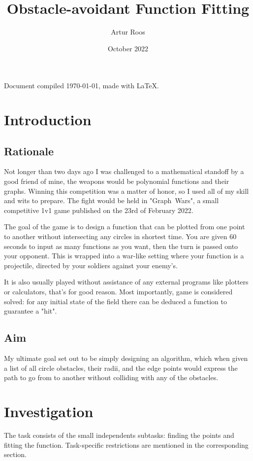 \documentclass[12pt, titlepage]{article}
\title{Obstacle-avoidant Function Fitting}
\author{Artur Roos}
\date{October 2022}
\begin{document}
\maketitle
\tableofcontents

{
\centering
Document compiled \today, made with \LaTeX.
}

\section{Introduction}
\subsection{Rationale}
Not longer than two days ago I was challenged to a mathematical standoff by a 
good friend of mine, the weapons would be polynomial functions and their 
graphs. Winning this competition was a matter of honor, so I used all of my 
skill and wits to prepare. The fight would be held in \mbox{"Graph Wars"}, a 
small competitive 1v1 game published on the 23rd of February 2022. 

The goal of the game is to design a function that can be plotted from one point
to another without intersecting any circles in shortest time. You are given 
60 seconds to input as many functions as you want, then the turn is passed onto
your opponent.
This is wrapped into a war-like setting where your function is a projectile, 
directed by your soldiers against your enemy's.

It is also usually played without assistance of any external programs like 
plotters or calculators, that's for good reason. Most importantly, game is
considered solved: for any initial state of the field there can be deduced a 
function to guarantee a "hit". 

\subsection{Aim}
My ultimate goal  set out to be simply designing an algorithm, which when given
a list of all circle obstacles, their radii, and the edge points would express
the path to go from to another without colliding with any of the obstacles. 

\section{Investigation}
The task consists of the small independents subtasks: finding the points and 
fitting the function. Task-specific restrictions are mentioned in the 
corresponding section.
\end{document}
